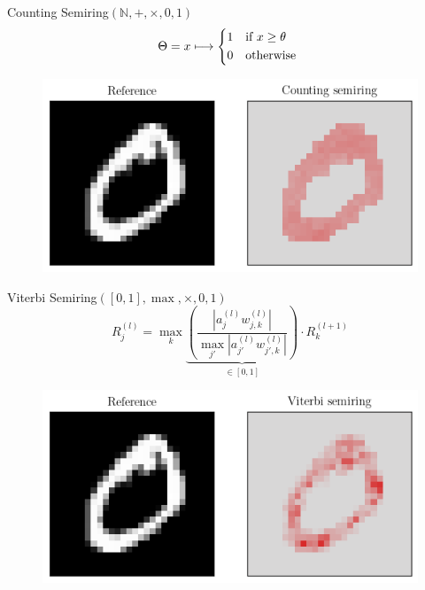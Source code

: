\documentclass[aspectratio=169]{beamer}
\theoremstyle{definition}
\begin{document}

\begin{frame}{Counting Semiring}{\large $(\mathbb{N}, +, \times, 0, 1)$}
    \begin{equation*}
        \Theta = x \longmapsto \begin{cases*}
            1 & if $x\geq\theta$\\
            0 & otherwise
        \end{cases*}
    \end{equation*}

    \begin{figure}[H]
        \centering
        \includegraphics[width=.5\textwidth]{counting.png}
    \end{figure}
\end{frame}

\begin{frame}{Viterbi Semiring}{\large $([0, 1], \max, \times, 0, 1)$}
    \begin{equation*}
        R^{(l)}_j = \max_k \underbrace{\left(\frac{\left|a^{(l)}_jw_{j, k}^{(l)}\right|}{\max_{j'} \left|a^{(l)}_{j'}w_{j', k}^{(l)}\right|}\right)}_{\in[0, 1]} \cdot R^{(l+1)}_k
    \end{equation*}

    \begin{figure}[H]
        \centering
        \includegraphics[width=.5\textwidth]{viterbi.png}
    \end{figure}
\end{frame}
\end{document}
